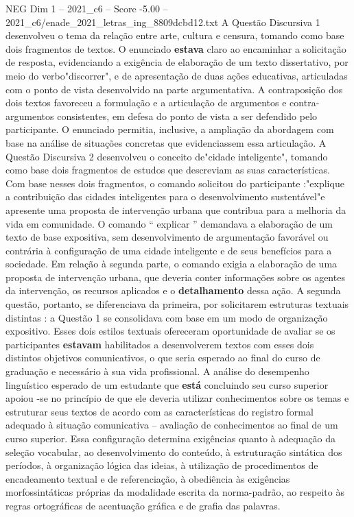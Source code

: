 \begin{textsample}{NEG Dim 1 – 2021\_c6 – Score -5.00 – 2021\_c6/enade\_2021\_letras\_ing\_8809dcbd12.txt}
A Questão Discursiva 1 desenvolveu o tema da relação entre arte, cultura e censura, tomando como base dois fragmentos de textos.
O enunciado \textbf{estava} claro ao encaminhar a solicitação de resposta, evidenciando a exigência de elaboração de um texto dissertativo, por meio do verbo"discorrer", e de apresentação de duas ações educativas, articuladas com o ponto de vista desenvolvido na parte argumentativa.
A contraposição dos dois textos favoreceu a formulação e a articulação de argumentos e contra-argumentos consistentes, em defesa do ponto de vista a ser defendido pelo participante.
O enunciado permitia, inclusive, a ampliação da abordagem com base na análise de situações concretas que evidenciassem essa articulação.
A Questão Discursiva 2 desenvolveu o conceito de"cidade inteligente", tomando como base dois fragmentos de estudos que descreviam as suas características.
Com base nesses dois fragmentos, o comando solicitou do participante :"explique a contribuição das cidades inteligentes para o desenvolvimento sustentável"e apresente uma proposta de intervenção urbana que contribua para a melhoria da vida em comunidade.
O comando “ explicar ” demandava a elaboração de um texto de base expositiva, sem desenvolvimento de argumentação favorável ou contrária à configuração de uma cidade inteligente e de seus benefícios para a sociedade.
Em relação à segunda parte, o comando exigia a elaboração de uma proposta de intervenção urbana, que deveria conter informações sobre os agentes da intervenção, os recursos aplicados e o \textbf{detalhamento} dessa ação.
A segunda questão, portanto, se diferenciava da primeira, por solicitarem estruturas textuais distintas : a Questão 1 se consolidava com base em um modo de organização expositivo.
Esses dois estilos textuais ofereceram oportunidade de avaliar se os participantes \textbf{estavam} habilitados a desenvolverem textos com esses dois distintos objetivos comunicativos, o que seria esperado ao final do curso de graduação e necessário à sua vida profissional.
A análise do desempenho linguístico esperado de um estudante que \textbf{está} concluindo seu curso superior apoiou -se no princípio de que ele deveria utilizar conhecimentos sobre os temas e estruturar seus textos de acordo com as características do registro formal adequado à situação comunicativa – avaliação de conhecimentos ao final de um curso superior.
Essa configuração determina exigências quanto à adequação da seleção vocabular, ao desenvolvimento do conteúdo, à estruturação sintática dos períodos, à organização lógica das ideias, à utilização de procedimentos de encadeamento textual e de referenciação, à obediência às exigências morfossintáticas próprias da modalidade escrita da norma-padrão, ao respeito às regras ortográficas de acentuação gráfica e de grafia das palavras.

\end{textsample}
